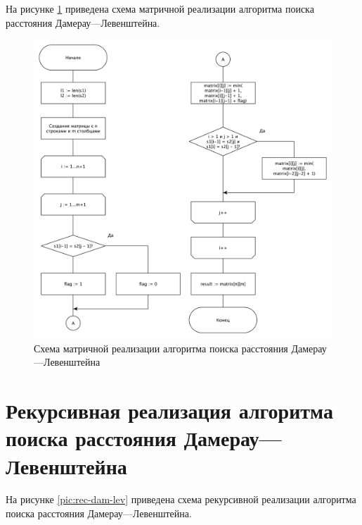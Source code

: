 На рисунке \ref{pic:matr-dam-lev} приведена схема матричной реализации алгоритма поиска расстояния Дамерау---Левенштейна.

\begin{figure}[H]
	\centering
	\includegraphics[scale=0.57]{assets/dam-lev-matr.pdf}
	\caption{Схема матричной реализации алгоритма поиска расстояния Дамерау---Левенштейна}
	\label{pic:matr-dam-lev}
\end{figure}

\newpage

\section{Рекурсивная реализация алгоритма поиска расстояния Дамерау---Левенштейна}

На рисунке \ref{pic:rec-dam-lev} приведена схема рекурсивной реализации алгоритма поиска расстояния Дамерау---Левенштейна.

